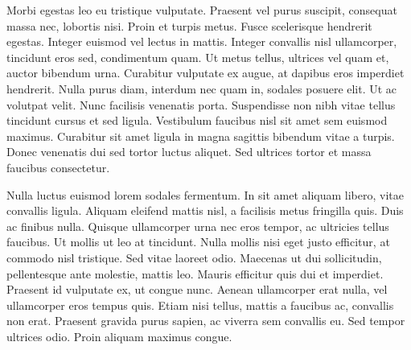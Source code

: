 Morbi egestas leo eu tristique vulputate. Praesent vel purus suscipit, consequat massa nec, lobortis nisi. Proin et turpis metus. Fusce scelerisque hendrerit egestas. Integer euismod vel lectus in mattis. Integer convallis nisl ullamcorper, tincidunt eros sed, condimentum quam. Ut metus tellus, ultrices vel quam et, auctor bibendum urna. Curabitur vulputate ex augue, at dapibus eros imperdiet hendrerit. Nulla purus diam, interdum nec quam in, sodales posuere elit. Ut ac volutpat velit. Nunc facilisis venenatis porta. Suspendisse non nibh vitae tellus tincidunt cursus et sed ligula. Vestibulum faucibus nisl sit amet sem euismod maximus. Curabitur sit amet ligula in magna sagittis bibendum vitae a turpis. Donec venenatis dui sed tortor luctus aliquet. Sed ultrices tortor et massa faucibus consectetur.

Nulla luctus euismod lorem sodales fermentum. In sit amet aliquam libero, vitae convallis ligula. Aliquam eleifend mattis nisl, a facilisis metus fringilla quis. Duis ac finibus nulla. Quisque ullamcorper urna nec eros tempor, ac ultricies tellus faucibus. Ut mollis ut leo at tincidunt. Nulla mollis nisi eget justo efficitur, at commodo nisl tristique. Sed vitae laoreet odio. Maecenas ut dui sollicitudin, pellentesque ante molestie, mattis leo. Mauris efficitur quis dui et imperdiet. Praesent id vulputate ex, ut congue nunc. Aenean ullamcorper erat nulla, vel ullamcorper eros tempus quis. Etiam nisi tellus, mattis a faucibus ac, convallis non erat. Praesent gravida purus sapien, ac viverra sem convallis eu. Sed tempor ultrices odio. Proin aliquam maximus congue.